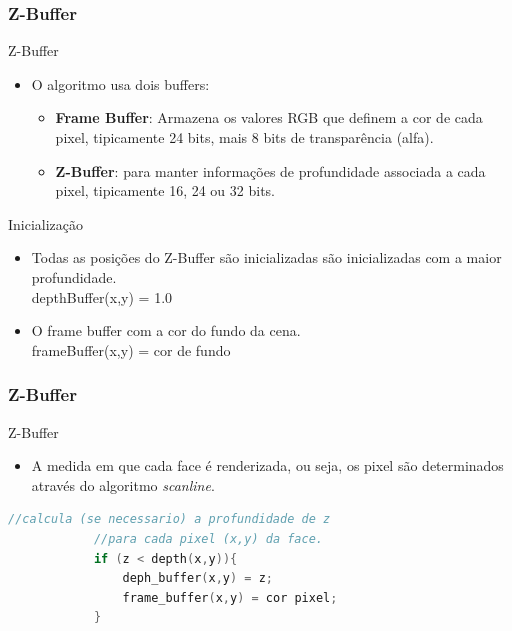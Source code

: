\documentclass{beamer}
\begin{document}
\begin{frame}
\frametitle{Z-Buffer}

		\begin{block}{Z-Buffer}
			\begin{itemize}	
				\item O algoritmo usa dois buffers:
					\begin{itemize}
						\item \textbf{Frame Buffer}: Armazena os valores RGB que definem a cor de cada pixel, tipicamente 24 bits, mais 8 bits de transparência (alfa).
						\item \textbf{Z-Buffer}: para manter informações de profundidade associada a cada pixel, tipicamente 16, 24 ou 32 bits.
					\end{itemize}
			\end{itemize}
		\end{block}
		
		\begin{block}{Inicialização}
			\begin{itemize}	
				\item Todas as posições do Z-Buffer são inicializadas são inicializadas com a maior profundidade. \\depthBuffer(x,y) = 1.0
				\item O frame buffer com a cor do fundo da cena.\\ frameBuffer(x,y) = cor de fundo
			\end{itemize}
		\end{block}
		
\end{frame}


\begin{frame}[fragile]
\frametitle{Z-Buffer}

		\begin{block}{Z-Buffer}
			\begin{itemize}	
				\item A medida em que cada face é renderizada, ou seja, os pixel são determinados através do algoritmo \textit{scanline}.
			\end{itemize}
		\end{block}
		
		\begin{lstlisting}[language=C++]
			//calcula (se necessario) a profundidade de z
			//para cada pixel (x,y) da face.
			if (z < depth(x,y)){
			    deph_buffer(x,y) = z;
			    frame_buffer(x,y) = cor pixel;
			}
		\end{lstlisting}
		
\end{frame}
\end{document}
